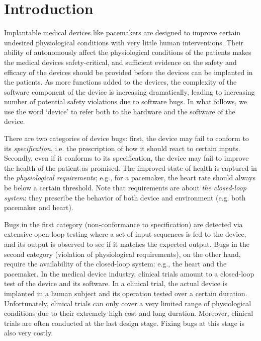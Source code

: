 \section{Introduction}
\label{introduction}

Implantable medical devices like pacemakers are designed to improve certain undesired physiological conditions with very little human interventions. 
Their ability of autonomously affect the physiological conditions of the patients makes the medical devices safety-critical, and sufficient evidence on the safety and efficacy of the devices should be provided before the devices can be implanted in the patients. 
As more functions added to the devices, the complexity of the software component of the device is increasing dramatically, leading to increasing number of potential safety violations due to software bugs. 
In what follows, we use the word `device' to refer both to the hardware and the software of the device.

There are two categories of device bugs: 
first, the device may fail to conform to its \emph{specification}, i.e. the prescription of how it should react to certain inputs.  
Secondly, even if it conforms to its specification, the device may fail to improve the health of the patient as promised. 
The improved state of health is captured in the \emph{physiological requirements}; e.g., for a pacemaker, the heart rate should always be below a certain threshold. 
Note that requirements are about \emph{the closed-loop system}: they prescribe the behavior of both device and environment (e.g. both pacemaker and heart).

Bugs in the first category (non-conformance to specification) are detected via extensive open-loop testing where a set of input sequences is fed to the device, and its output is observed to see if it matches the expected output.
Bugs in the second category (violation of physiological requirements), on the other hand, require the availability of the closed-loop system: e.g., the heart and the pacemaker. 
In the medical device industry, clinical trials amount to a closed-loop test of the device and its software. 
In a clinical trial, the actual device is implanted in a human subject and its operation tested over a certain duration.
Unfortunately, clinical trials can only cover a very limited range of physiological conditions due to their extremely high cost and long duration. 
Moreover, clinical trials are often conducted at the last design stage. Fixing bugs at this stage is also very costly.

